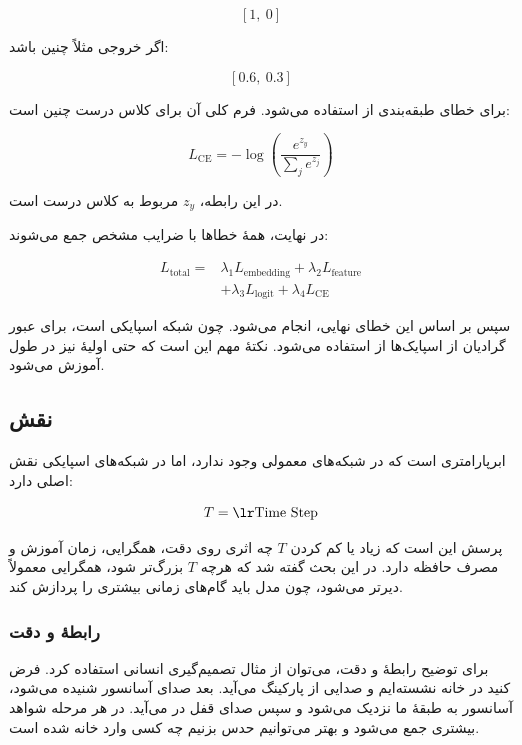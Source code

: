\[
[1,\ 0]
\]

اگر خروجی  مثلاً چنین باشد:

\[
[0.6,\ 0.3]
\]

برای خطای طبقه‌بندی از  استفاده می‌شود. فرم کلی آن برای کلاس درست چنین است:

\[
L_{\text{CE}} =
-\log\left(
\frac{e^{z_y}}{\sum_j e^{z_j}}
\right)
\]

در این رابطه، \(z_y\)  مربوط به کلاس درست است.

در نهایت، همهٔ خطاها با ضرایب مشخص جمع می‌شوند:

\[
\begin{aligned}
L_{\text{total}} ={}&
\lambda_1 L_{\text{embedding}}
+ \lambda_2 L_{\text{feature}} \\
&+ \lambda_3 L_{\text{logit}}
+ \lambda_4 L_{\text{CE}}
\end{aligned}
\]

سپس بر اساس این خطای نهایی،  انجام می‌شود. چون شبکه اسپایکی است، برای عبور گرادیان از اسپایک‌ها از  استفاده می‌شود. نکتهٔ مهم این است که حتی  اولیهٔ  نیز در طول آموزش  می‌شود.


\subsection{نقش }
 ابرپارامتری است که در شبکه‌های معمولی وجود ندارد، اما در شبکه‌های اسپایکی نقش اصلی دارد:

\[
T = \text{\eng{Time Step}}
\]

پرسش این است که زیاد یا کم کردن \(T\) چه اثری روی دقت، همگرایی، زمان آموزش و مصرف حافظه دارد. در این بحث گفته شد که هرچه \(T\) بزرگ‌تر شود، همگرایی معمولاً دیرتر می‌شود، چون مدل باید گام‌های زمانی بیشتری را پردازش کند.

\subsubsection{رابطهٔ  و دقت}
برای توضیح رابطهٔ  و دقت، می‌توان از مثال تصمیم‌گیری انسانی استفاده کرد. فرض کنید در خانه نشسته‌ایم و صدایی از پارکینگ می‌آید. بعد صدای آسانسور شنیده می‌شود، آسانسور به طبقهٔ ما نزدیک می‌شود و سپس صدای قفل در می‌آید. در هر مرحله شواهد بیشتری جمع می‌شود و بهتر می‌توانیم حدس بزنیم چه کسی وارد خانه شده است.

